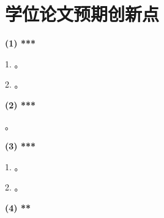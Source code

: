 
\section{学位论文预期创新点}

\noindent \textbf{(1) ***}

1. 。

2. 。

\noindent \textbf{(2) ***}

。

\noindent \textbf{(3) ***}

1. 。


2. 。

\noindent \textbf{(4) **}


